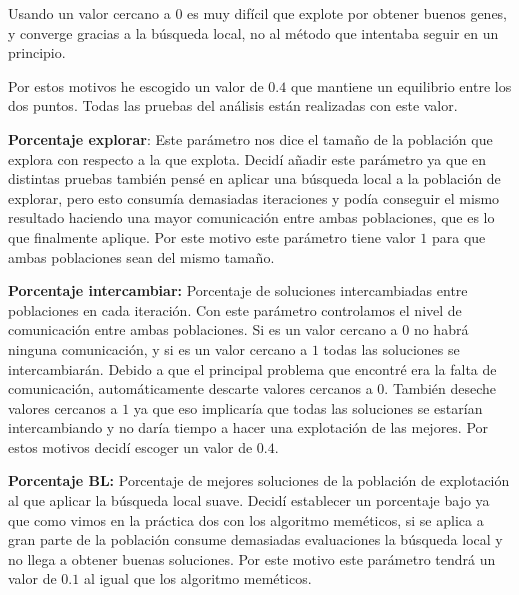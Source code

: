 \documentclass[12pt, spanish]{article}
\begin{document}
Usando un valor cercano a $0$ es muy difícil que explote por obtener buenos genes, y converge gracias a la búsqueda local, no al método que intentaba seguir en un principio.


Por estos motivos he escogido un valor de $0.4$ que mantiene un equilibrio entre los dos puntos. Todas las pruebas del análisis están realizadas con este valor.


\textbf{Porcentaje explorar}: Este parámetro nos dice el tamaño de la población que explora con respecto a la que explota. Decidí añadir este parámetro ya que en distintas pruebas también pensé en aplicar una búsqueda local a la población de explorar, pero esto consumía demasiadas iteraciones y podía conseguir el mismo resultado haciendo una mayor comunicación entre ambas poblaciones, que es lo que finalmente aplique. Por este motivo este parámetro tiene valor $1$ para que ambas poblaciones sean del mismo tamaño.

\textbf{Porcentaje intercambiar:} Porcentaje de soluciones intercambiadas entre poblaciones en cada iteración. Con este parámetro controlamos el nivel de comunicación entre ambas poblaciones. Si es un valor cercano a $0$ no habrá ninguna comunicación, y si es un valor cercano a $1$ todas las soluciones se intercambiarán. Debido a que el principal problema que encontré era la falta de comunicación, automáticamente descarte valores cercanos a 0. También deseche valores cercanos a $1$ ya que eso implicaría que todas las soluciones se estarían intercambiando y no daría tiempo a hacer una explotación de las mejores. Por estos motivos decidí escoger un valor de $0.4$.

\textbf{Porcentaje BL:} Porcentaje de mejores soluciones de la población de explotación al que aplicar la búsqueda local suave. Decidí establecer un porcentaje bajo ya que como vimos en la práctica dos con los algoritmo meméticos, si se aplica a gran parte de la población consume demasiadas evaluaciones la búsqueda local y no llega a obtener buenas soluciones. Por este motivo este parámetro tendrá un valor de $0.1$ al igual que los algoritmo meméticos.
\end{document}

